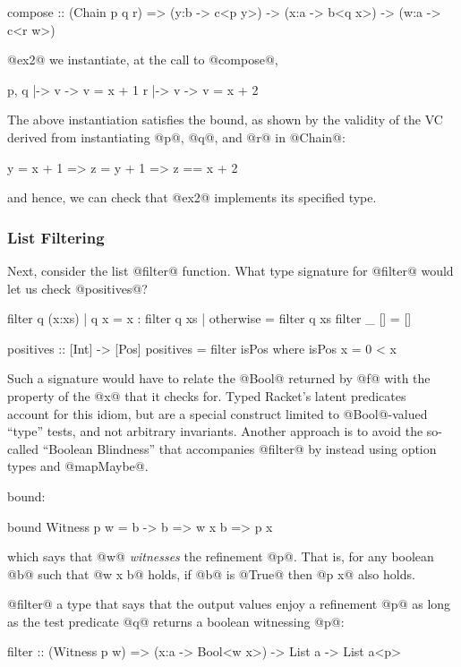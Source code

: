 \begin{code}
  compose :: (Chain p q r) => (y:b -> c<p y>)
                           -> (x:a -> b<q x>)
                           -> (w:a -> c<r w>)
\end{code}

 @ex2@ we instantiate, at the call to @compose@,
%
\begin{code}
  p, q |-> \x v -> v = x + 1
     r |-> \x v -> v = x + 2
\end{code}
%
The above instantiation satisfies the bound, as shown by the validity
of the VC derived from instantiating @p@, @q@, and @r@ in @Chain@:
%
\begin{code}
  y = x + 1 => z = y + 1 => z == x + 2
\end{code}
%
and hence, we can check that @ex2@ implements its specified type.


\subsubsection{List Filtering}

Next, consider the list @filter@ function.
%
What type signature for @filter@ would let us check @positives@?
\begin{code}
  filter q (x:xs)
    | q x         = x : filter q xs
    | otherwise   = filter q xs
  filter _ []     = []

  positives       :: [Int] -> [Pos]
  positives       = filter isPos
    where isPos x = 0 < x
\end{code}
%
Such a signature would have to relate the @Bool@ returned by
@f@ with the property of the @x@ that it checks for.
%
Typed Racket's latent predicates~\cite{typedracket}
account for this idiom, but are a special construct
limited to @Bool@-valued ``type'' tests, and not
arbitrary invariants.
%
Another approach is to avoid the so-called
``Boolean Blindness'' that accompanies
@filter@ by instead using option types
and @mapMaybe@.

 bound:
%
\begin{code}
  bound Witness p w = \x b -> b => w x b => p x
\end{code}
%
which says that @w@ \emph{witnesses} the
refinement @p@. That is, for any boolean @b@ such
that @w x b@ holds, if @b@ is @True@ then @p x@ also holds.

 @filter@ a type that says that the output values
enjoy a refinement @p@ as long as the test predicate @q@ returns
a boolean witnessing @p@:
%
\begin{code}
  filter :: (Witness p w) => (x:a -> Bool<w x>)
                          -> List a
                          -> List a<p>
\end{code}

